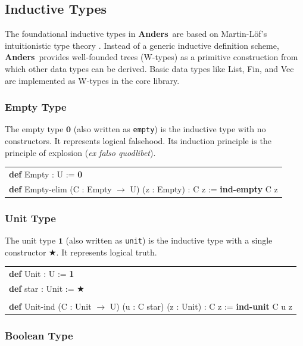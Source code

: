 \documentclass[a4paper,UKenglish,cleveref, autoref, thm-restate]{lipics-v2021}
\newcommand{\tabstyle}[0]{\scriptsize\ttfamily\fontseries{l}\selectfont}
\newcommand{\anders}[0]{\textbf{Anders}}
\begin{document}
\subsection{Inductive Types}

The foundational inductive types in \anders\ are based on Martin-L\"{o}f's intuitionistic type theory \cite{ML84}. Instead of a generic inductive definition scheme, \anders\ provides well-founded trees (W-types) as a primitive construction from which other data types can be derived. Basic data types like List, Fin, and Vec are implemented as W-types in the core library.

\subsubsection*{Empty Type}

The empty type $\mathbf{0}$ (also written as \texttt{empty}) is the inductive type with no constructors. It represents logical falsehood. Its induction principle is the principle of explosion (\textit{ex falso quodlibet}).

\begin{table}[ht!]
\tabstyle
\begin{tabular}{l}
\textbf{def} Empty : U := \textbf{0} \\
\textbf{def} Empty-elim (C : Empty $\rightarrow$ U) (z : Empty) : C z := \textbf{ind-empty} C z
\end{tabular}
\end{table}

\subsubsection*{Unit Type}

The unit type $\mathbf{1}$ (also written as \texttt{unit}) is the inductive type with a single constructor ★. It represents logical truth.

\begin{table}[ht!]
\tabstyle
\begin{tabular}{l}
\textbf{def} Unit : U := \textbf{1} \\
\textbf{def} star : Unit := ★ \\
\\
\textbf{def} Unit-ind (C : Unit $\rightarrow$ U) (u : C star) (z : Unit) : C z := \textbf{ind-unit} C u z
\end{tabular}
\end{table}

\subsubsection*{Boolean Type}
\end{document}
